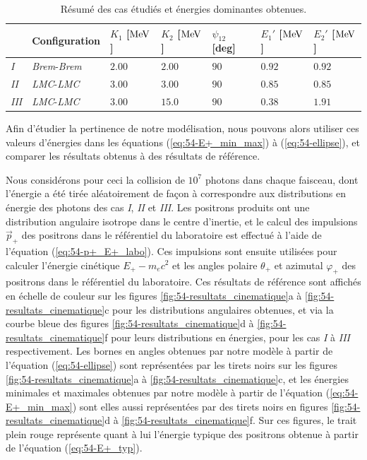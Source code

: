 \begin{refsection}
\begin{table}
    \centering
    \begin{tabular}{ | l | l | l | l | l | l | l |}
    \hline
            & Configuration & $K_1$ [$\rm MeV$] & $K_2$ [$\rm MeV$] & $\psi_{12}$ [deg] & $E_1'$ [$\rm MeV$] & $E_2'$ [$\rm MeV$] \\
    \hline
 \textit{I}   & \textit{Brem}-\textit{Brem} & $2.00$            & $2.00$            & $90$              & $0.92$             & $0.92$             \\
 \textit{II}  & \textit{LMC}-\textit{LMC}   & $3.00$            & $3.00$            & $90$              & $0.85$             & $0.85$             \\
 \textit{III} & \textit{LMC}-\textit{LMC}   & $3.00$            & $15.0$            & $90$              & $0.38$             & $1.91$             \\
    \hline
    \end{tabular}
    \caption{Résumé des cas étudiés et énergies dominantes obtenues.}
	\label{tab:54-energies_dominantes}
\end{table}

Afin d'étudier la pertinence de notre modélisation, nous pouvons alors utiliser ces valeurs d'énergies dans les équations (\ref{eq:54-E+_min_max}) à (\ref{eq:54-ellipse}), et comparer les résultats obtenus à des résultats de référence. 

Nous considérons pour ceci la collision de $10^7$ photons dans chaque faisceau, dont l'énergie a été tirée aléatoirement de façon à correspondre aux distributions en énergie des photons des cas \textit{I}, \textit{II} et \textit{III}. Les positrons produits ont une distribution angulaire isotrope dans le centre d'inertie, et le calcul des impulsions $\vec{p}_+$ des positrons dans le référentiel du laboratoire est effectué à l'aide de l'équation (\ref{eq:54-p+_E+_labo}). Ces impulsions sont ensuite utilisées pour calculer l'énergie cinétique $E_+-m_e c^2$ et les angles polaire $\theta_+$ et azimutal $\varphi_+$ des positrons dans le référentiel du laboratoire. Ces résultats de référence sont affichés en échelle de couleur sur les figures \ref{fig:54-resultats_cinematique}a à \ref{fig:54-resultats_cinematique}c pour les distributions angulaires obtenues, et via la courbe bleue des figures \ref{fig:54-resultats_cinematique}d à \ref{fig:54-resultats_cinematique}f pour leurs distributions en énergies, pour les cas \textit{I} à \textit{III} respectivement. 
Les bornes en angles obtenues par notre modèle à partir de l'équation (\ref{eq:54-ellipse}) sont représentées par les tirets noirs sur les figures \ref{fig:54-resultats_cinematique}a à \ref{fig:54-resultats_cinematique}c, et les énergies minimales et maximales obtenues par notre modèle à partir de l'équation (\ref{eq:54-E+_min_max}) sont elles aussi représentées par des tirets noirs en figures \ref{fig:54-resultats_cinematique}d à \ref{fig:54-resultats_cinematique}f. Sur ces figures, le trait plein rouge représente quant à lui l'énergie typique des positrons obtenue à partir de l'équation (\ref{eq:54-E+_typ}).


\end{refsection}
